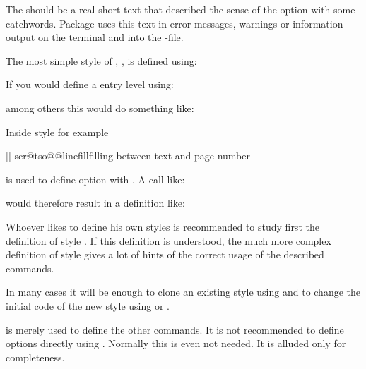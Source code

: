The  should be a real short text that described the sense
of the option with some catchwords. Package  uses this text
in error messages, warnings or information output on the terminal and into the
-file.

The most simple style of , , is defined
using:
\begin{lstcode}[belowskip=\dp\strutbox plus 1pt]
\end{lstcode}
If you would define a entry level  using:
\begin{lstcode}[belowskip=\dp\strutbox plus 1pt]
\end{lstcode}
among others this would do something like:
\begin{lstcode}[belowskip=\dp\strutbox plus 1pt]
  \def\dummytocdepth{1}
  \def\l@dummy#1#2{}
\end{lstcode}

Inside style  for example
\begin{lstcode}[belowskip=\dp\strutbox plus 1pt]
  [\TOCLineLeaderFill]%
  {scr@tso@}{@linefill}{filling between text and page number}%
\end{lstcode}
is used to define option  with 
. A call like:
\begin{lstcode}[belowskip=\dp\strutbox plus 1pt]
\end{lstcode}
would therefore result in a definition like:
\begin{lstcode}[belowskip=\dp\strutbox plus 1pt]
  \def\scr@tso@part@linefill{\TOCLineLeaderFill}
\end{lstcode}

Whoever likes to define his own styles is recommended to study first the
definition of style . If this definition is understood,
the much more complex definition of style  gives a lot of
hints of the correct usage of the described commands.

In many cases it will be enough to clone an existing style using
 and to change the initial code of the new style
using  or .

 is merely used to define the other
commands. It is not recommended to define options directly using
. Normally this is even not needed. It is
alluded only for completeness.%
%
%
%
%
%
%
%

